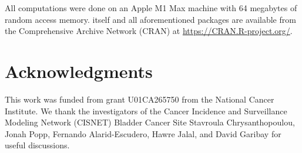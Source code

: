 \documentclass[article,nojss]{jss}\usepackage[]{graphicx}\usepackage[]{xcolor}
\begin{document}
All computations were done on an Apple M1 Max machine with 64 megabytes of random access memory. 
%
 itself
and all aforementioned packages are available from the Comprehensive
 Archive Network (CRAN) at
\url{https://CRAN.R-project.org/}.


\section*{Acknowledgments}
This work was funded from grant U01CA265750 from the National Cancer Institute.
We thank the investigators of the Cancer Incidence and Surveillance Modeling Network (CISNET)
Bladder Cancer Site Stavroula Chrysanthopoulou, Jonah Popp, Fernando Alarid-Escudero,
Hawre Jalal, and David Garibay for useful discussions.


\newpage



\end{document}
